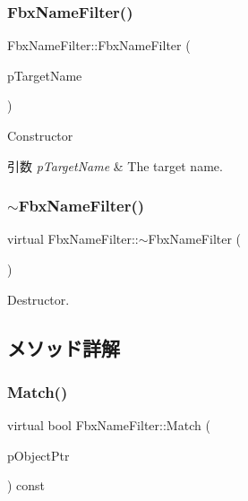 \subsubsection{\texorpdfstring{Fbx\+Name\+Filter()}{FbxNameFilter()}}
{\footnotesize\ttfamily Fbx\+Name\+Filter\+::\+Fbx\+Name\+Filter (\begin{DoxyParamCaption}\item[{const char $\ast$}]{p\+Target\+Name }\end{DoxyParamCaption})}

Constructor 
\begin{DoxyParams}{引数}
{\em p\+Target\+Name} & The target name. \\
\hline
\end{DoxyParams}
\mbox{\label{class_fbx_name_filter_a44742170200731e2943525ccad88c48e}} 
\subsubsection{\texorpdfstring{$\sim$\+Fbx\+Name\+Filter()}{~FbxNameFilter()}}
{\footnotesize\ttfamily virtual Fbx\+Name\+Filter\+::$\sim$\+Fbx\+Name\+Filter (\begin{DoxyParamCaption}{ }\end{DoxyParamCaption})\hspace{0.3cm}{\ttfamily [virtual]}}



Destructor. 



\subsection{メソッド詳解}
\mbox{\label{class_fbx_name_filter_a2767c75f626baed7800308f937302743}} 
\subsubsection{\texorpdfstring{Match()}{Match()}}
{\footnotesize\ttfamily virtual bool Fbx\+Name\+Filter\+::\+Match (\begin{DoxyParamCaption}\item[{const \hyperlink{class_fbx_object}{Fbx\+Object} $\ast$}]{p\+Object\+Ptr }\end{DoxyParamCaption}) const\hspace{0.3cm}{\ttfamily [virtual]}}

